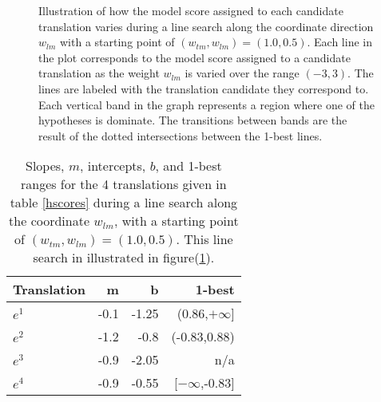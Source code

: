 \documentclass[11pt]{article}
\begin{document}
\begin{figure}[h]
\vskip 0.2in
\begin{center}
\setlength{\epsfxsize}{3.0in}
\centerline{}
\vskip -0.15in
\caption{Illustration of how the model score assigned to each candidate translation varies during a line search along the coordinate direction \mbox{$w_{lm}$} with a starting point of \mbox{$(w_{tm}, w_{lm}) = (1.0, 0.5)$}. Each line in the plot corresponds to the model score assigned to a candidate translation as the weight \mbox{$w_{lm}$} is varied over the range \mbox{$(-3,3)$}.  The lines are labeled with the translation candidate they correspond to. Each vertical band in the graph represents a region where one of the hypotheses is dominate. The transitions between bands are the result of the dotted intersections between the 1-best lines.
\label{mertlinesearch}
}
\end{center}
\vskip -0.2in
\end{figure}

\begin{table}
\begin{center}
\begin{tabular}{|l|rrr|}
\hline \bf Translation  & \bf m  & \bf b & \bf 1-best  \\
\hline
\mbox{$e^1$}     & -0.1 & -1.25  & (0.86,\mbox{$+\infty$}] \\
\mbox{$e^2$}     & -1.2 & -0.8   & (-0.83,0.88) \\
\mbox{$e^3$}     & -0.9 & -2.05  & n/a \\
\mbox{$e^4$}     & -0.9 & -0.55  & [\mbox{$-\infty$},-0.83] \\
\hline
\end{tabular}
\end{center}
\caption{Slopes, \mbox{$m$}, intercepts, \mbox{$b$}, and 1-best ranges for the 4 translations given in table \ref{hscores} during a line search along the coordinate \mbox{$w_{lm}$}, with a starting point of \mbox{$(w_{tm}, w_{lm}) = (1.0, 0.5)$}. This line search in illustrated in figure(\ref{mertlinesearch}).
\label{hlinesearch}
}
\end{table}
\end{document}
